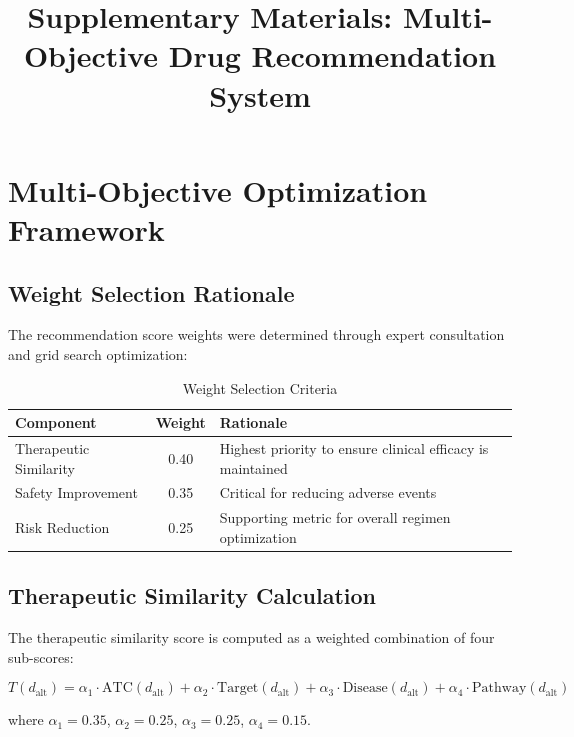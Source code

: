 \documentclass[11pt,a4paper]{article}
\begin{document}
\title{Supplementary Materials: Multi-Objective Drug Recommendation System}
\date{}
\maketitle

\tableofcontents
\newpage

\section{Multi-Objective Optimization Framework}

\subsection{Weight Selection Rationale}

The recommendation score weights were determined through expert consultation and grid search optimization:

\begin{table}[H]
\centering
\caption{Weight Selection Criteria}
\label{tab:weight_rationale}
\begin{tabular}{lcp{8cm}}
\toprule
\textbf{Component} & \textbf{Weight} & \textbf{Rationale} \\
\midrule
Therapeutic Similarity & 0.40 & Highest priority to ensure clinical efficacy is maintained \\
Safety Improvement & 0.35 & Critical for reducing adverse events \\
Risk Reduction & 0.25 & Supporting metric for overall regimen optimization \\
\bottomrule
\end{tabular}
\end{table}

\subsection{Therapeutic Similarity Calculation}

The therapeutic similarity score is computed as a weighted combination of four sub-scores:

\begin{equation}
T(d_{\text{alt}}) = \alpha_1 \cdot \text{ATC}(d_{\text{alt}}) + \alpha_2 \cdot \text{Target}(d_{\text{alt}}) + \alpha_3 \cdot \text{Disease}(d_{\text{alt}}) + \alpha_4 \cdot \text{Pathway}(d_{\text{alt}})
\end{equation}

where $\alpha_1 = 0.35$, $\alpha_2 = 0.25$, $\alpha_3 = 0.25$, $\alpha_4 = 0.15$.
\end{document}
